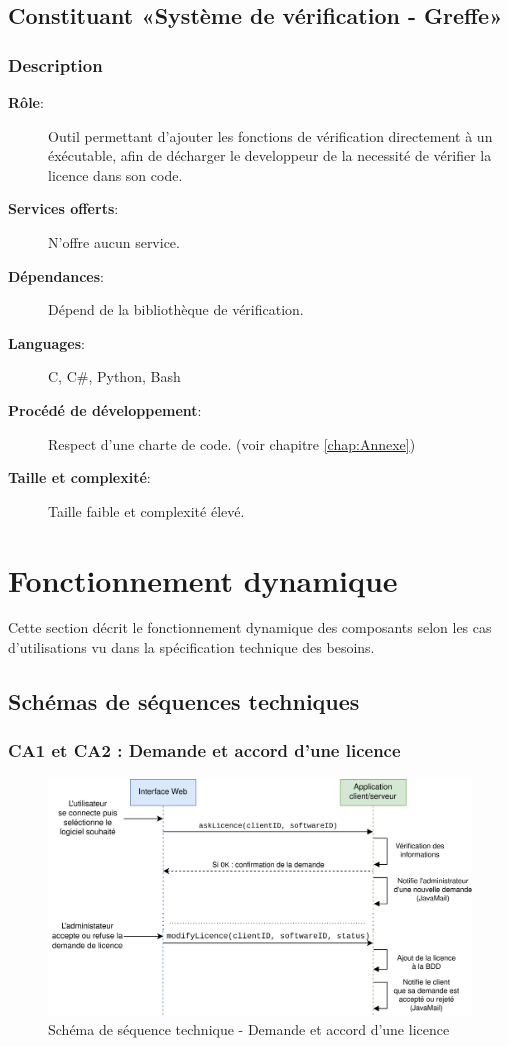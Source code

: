 \section{Constituant «Système de vérification - Greffe»}
\subsection*{Description}
\begin{description}
	\item[\textbf{Rôle}:]
			Outil permettant d'ajouter les fonctions de vérification directement à un
			éxécutable, afin de décharger le developpeur de la necessité de vérifier 
			la licence dans son code.
	\item[\textbf{Services offerts}:]
		N'offre aucun service.
	\item[\textbf{Dépendances}:]
		Dépend de la bibliothèque de vérification.
	\item[\textbf{Languages}:]
		C, C\#, Python, Bash 
	\item[\textbf{Procédé de développement}:]
		Respect d'une charte de code. (voir chapitre \ref{chap:Annexe}) 
	\item[\textbf{Taille et complexité}:]
		Taille faible et complexité élevé.
\end{description}


\chapter{Fonctionnement dynamique}
Cette section décrit le fonctionnement dynamique des composants selon les cas d'utilisations vu
dans la spécification technique des besoins.

\section{Schémas de séquences techniques}

\subsection{CA1 et CA2 : Demande et accord d'une licence}
\begin{figure}[!h]
    \centering
    \includegraphics[width=\textwidth]{../png/SSD-demande-licence.png}
    \caption{Schéma de séquence technique - Demande et accord d'une licence}
\end{figure}
\newpage


